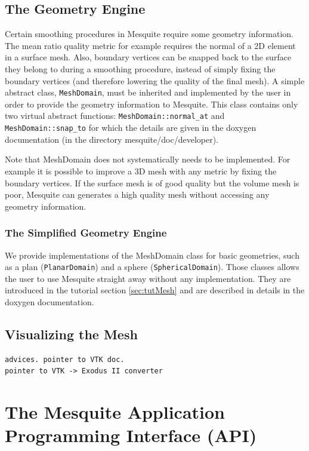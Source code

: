 \documentclass[letter]{report}
\begin{document}
\section{The Geometry Engine}
\label{sec:geometry}

Certain smoothing procedures in Mesquite require some geometry information. The mean ratio quality
metric for example requires the normal of a 2D element in a surface mesh. Also, boundary
vertices can be snapped back to the surface they belong to during a smoothing procedure, instead of
simply fixing the boundary vertices (and therefore lowering the quality of the final mesh). A simple abstract
class, \texttt{MeshDomain}, must be inherited and implemented by the user in order to provide the
geometry information to Mesquite.  This class contains only two virtual abstract functions:
\texttt{MeshDomain::normal\_at} and \texttt{MeshDomain::snap\_to} for which the details are given in
the doxygen documentation (in the directory mesquite/doc/developer).

Note that MeshDomain does not systematically needs to be implemented. For example it is possible to
improve a 3D mesh with any metric by fixing the boundary vertices. If the surface mesh is of good
quality but the volume mesh is poor, Mesquite can generates a high quality mesh without accessing
any geometry information. 


\subsection{The Simplified Geometry Engine}

We provide implementations of the MeshDomain class for basic geometries, such as a plan
(\texttt{PlanarDomain}) and a sphere (\texttt{SphericalDomain}). Those classes allows the user to use
Mesquite straight away without any implementation. They are introduced in the tutorial section
\ref{sec:tutMesh} and are described in details in the doxygen documentation.

\section{Visualizing the Mesh}

\begin{verbatim}
advices. pointer to VTK doc. 
pointer to VTK -> Exodus II converter
\end{verbatim}

\chapter{The Mesquite Application Programming Interface (API)}
\end{document}
